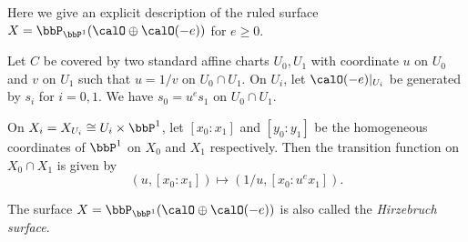     \begin{example}\label{eg:explicit_description_of_rational_ruled_surface}
        Here we give an explicit description of the ruled surface \(X = \bbP_{\bbP^1}(\calO \oplus \calO(-e))\) for \(e \geq 0\).
        
        Let \(C\) be covered by two standard affine charts \(U_0,U_1\) with coordinate \(u\) on \(U_0\) and \(v\) on \(U_1\) such that \(u = 1/v\) on \(U_0 \cap U_1\).
        On \(U_i\), let \(\calO(-e)|_{U_i}\) be generated by \(s_i\) for \(i=0,1\).
        We have \(s_0 = u^e s_1\) on \(U_0 \cap U_1\).

        On \(X_i = X_{U_i} \cong U_i \times \bbP^1\), let \([x_0:x_1]\) and \([y_0:y_1]\) be the homogeneous coordinates of \(\bbP^1\) on \(X_0\) and \(X_1\) respectively.
        Then the transition function on \(X_0 \cap X_1\) is given by 
        \[ (u,[x_0:x_1]) \mapsto (1/u, [x_0:u^ex_1]). \]
    \end{example}

    \begin{remark}\label{rmk:Hirzebruch_surface}
        The surface \(X = \bbP_{\bbP^1}(\calO \oplus \calO(-e))\) is also called the \emph{Hirzebruch surface}.
    \end{remark}

